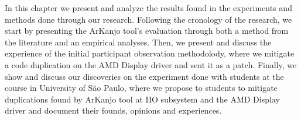 \en 

In this chapter we present and analyze the results found in the experiments and 
methods done through our research. Following the cronology of the research, we 
start by presenting the ArKanjo tool's evaluation through both a method from the literature
and an empirical analyses. Then, we present and discuss the experience of the initial participant
observation methodolody, where we mitigate a code duplication on the AMD Display driver and sent it as a patch.
Finally, we show and discuss our discoveries on the experiment done with students at the course in University of 
São Paulo, where we propose to students to mitigate duplications found by ArKanjo tool at IIO subsystem and the
AMD Display driver and document their founds, opinions and experiences.







